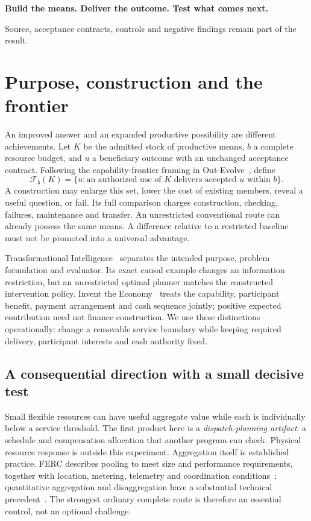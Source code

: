\documentclass[10pt,a4paper]{article}
\begin{document}
\vfill
{\color{ink}\large\textbf{Build the means. Deliver the outcome. Test what comes next.}}\par
\small Source, acceptance contracts, controls and negative findings remain part of the result.
\newpage

\section{Purpose, construction and the frontier}
An improved answer and an expanded productive possibility are different achievements. Let $K$ be the admitted stock of productive means, $b$ a complete resource budget, and $u$ a beneficiary outcome with an unchanged acceptance contract. Following the capability-frontier framing in Out-Evolve~\cite{outevolve2026}, define
\begin{equation}
\mathcal F_b(K)=\{u:\text{an authorized use of }K\text{ delivers accepted }u\text{ within }b\}.
\end{equation}
A construction may enlarge this set, lower the cost of existing members, reveal a useful question, or fail. Its full comparison charges construction, checking, failures, maintenance and transfer. An unrestricted conventional route can already possess the same means. A difference relative to a restricted baseline must not be promoted into a universal advantage.

Transformational Intelligence~\cite{ti2026} separates the intended purpose, problem formulation and evaluator. Its exact causal example changes an information restriction, but an unrestricted optimal planner matches the constructed intervention policy. Invent the Economy~\cite{economy2026} treats the capability, participant benefit, payment arrangement and cash sequence jointly; positive expected contribution need not finance construction. We use these distinctions operationally: change a removable service boundary while keeping required delivery, participant interests and cash authority fixed.

\subsection{A consequential direction with a small decisive test}
Small flexible resources can have useful aggregate value while each is individually below a service threshold. The first product here is a \emph{dispatch-planning artifact}: a schedule and compensation allocation that another program can check. Physical resource response is outside this experiment. Aggregation itself is established practice. FERC describes pooling to meet size and performance requirements, together with location, metering, telemetry and coordination conditions~\cite{ferc2222}; quantitative aggregation and disaggregation have a substantial technical precedent~\cite{mueller2017}. The strongest ordinary complete route is therefore an essential control, not an optional challenge.
\end{document}
